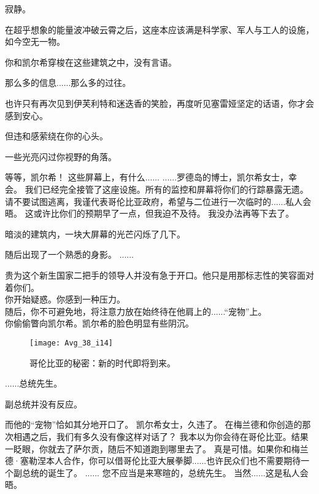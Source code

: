 \documentclass[openany]{book}
\begin{document}
寂静。\par
在超乎想象的能量波冲破云霄之后，这座本应该满是科学家、军人与工人的设施，如今空无一物。\par
你和凯尔希穿梭在这些建筑之中，没有言语。\par
那么多的信息......那么多的过往。\par
也许只有再次见到伊芙利特和迷迭香的笑脸，再度听见塞雷娅坚定的话语，你才会感到安心。\par
但违和感萦绕在你的心头。\par
一些光亮闪过你视野的角落。

\begin{dialogue}
     等等，凯尔希！
     这些屏幕上，有什么......
     ......罗德岛的博士，凯尔希女士，幸会。
     我们已经完全接管了这座设施。所有的监控和屏幕将你们的行踪暴露无遗。
     请不要试图逃离，我谨代表哥伦比亚政府，希望与二位进行一次临时的......私人会晤。
     这或许比你们的预期早了一点，但我迫不及待。
     我没办法再等下去了。\par
    暗淡的建筑内，一块大屏幕的光芒闪烁了几下。\par
    随后出现了一个熟悉的身影。
     ......\par
    贵为这个新生国家二把手的领导人并没有急于开口。他只是用那标志性的笑容面对着你们。\\
    你开始疑惑。你感到一种压力。\\
    随后，你不可避免地，将注意力放在始终待在他肩上的......“宠物”上。\\
    你偷偷瞥向凯尔希。凯尔希的脸色明显有些阴沉。
    \begin{figure}[h]
        \caption*{哥伦比亚的秘密：新的时代即将到来。}
        \centering
        \texttt{[image: Avg\_38\_i14]}
    \end{figure}
     ......总统先生。\par
    副总统并没有反应。\par
    而他的“宠物”恰如其分地开口了。
     凯尔希女士，久违了。
     在梅兰德和你创造的那次相遇之后，我们有多久没有像这样对话了？
     我本以为你会待在哥伦比亚。结果一眨眼，你就去了萨尔贡，随后不知道跑到哪里去了。
     真是可惜。如果你和梅兰德·塞勒涅本人合作，你可以借哥伦比亚大展拳脚......也许民众们也不需要期待一个副总统的诞生了。
     ......
     您不应当是来寒暄的，总统先生。
     当然......这是私人会晤。

\end{dialogue}
\end{document}
